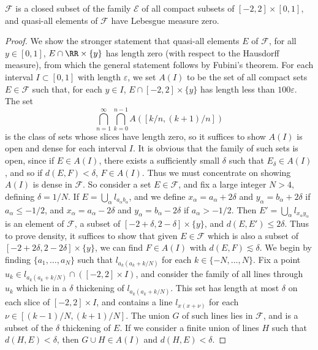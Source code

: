 \begin{theorem}
	$\mathcal{F}$ is a closed subset of the family $\mathcal{E}$ of all compact subsets of $[-2,2] \times [0,1]$, and quasi-all elements of $\mathcal{F}$ have Lebesgue measure zero.
\end{theorem}
\begin{proof}
	We show the stronger statement that quasi-all elements $E$ of $\mathcal{F}$, for all $y \in [0,1]$, $E \cap \RR \times \{ y \}$ has length zero (with respect to the Hausdorff measure), from which the general statement follows by Fubini's theorem. For each interval $I \subset [0,1]$ with length $\varepsilon$, we set $A(I)$ to be the set of all compact sets $E \in \mathcal{F}$ such that, for each $y \in I$, $E \cap [-2,2] \times \{ y \}$ has length less than $100 \varepsilon$. The set
	\[ \bigcap_{n = 1}^\infty \bigcap_{k = 0}^{n-1} A([k/n,(k+1)/n]) \]
	is the class of sets whose slices have length zero, so it suffices to show $A(I)$ is open and dense for each interval $I$. It is obvious that the family of such sets is open, since if $E \in A(I)$, there exists a sufficiently small $\delta$ such that $E_\delta \in A(I)$, and so if $d(E,F) < \delta$, $F \in A(I)$. Thus we must concentrate on showing $A(I)$ is dense in $\mathcal{F}$. So consider a set $E \in \mathcal{F}$, and fix a large integer $N > 4$, defining $\delta = 1/N$. If $E = \bigcup_\alpha l_{a_\alpha b_\alpha}$, and we define $x_\alpha = a_\alpha + 2\delta$ and $y_\alpha = b_\alpha + 2\delta$ if $a_\alpha \leq -1/2$, and $x_\alpha = a_\alpha - 2\delta$ and $y_\alpha = b_\alpha - 2\delta$ if $a_\alpha > -1/2$. Then $E' = \bigcup_\alpha l_{x_\alpha y_\alpha}$ is an element of $\mathcal{F}$, a subset of $[-2+\delta,2-\delta] \times \{ y \}$, and $d(E,E') \leq 2\delta$. Thus to prove density, it suffices to show that given $E \in \mathcal{F}$ which is also a subset of $[-2+2\delta,2-2\delta] \times \{ y \}$, we can find $F \in A(I)$ with $d(E,F) \lesssim \delta$. We begin by finding $\{ a_1, \dots, a_N \}$ such that $l_{a_k(a_k + k/N)}$ for each $k \in \{ -N, \dots, N \}$. Fix a point $u_k \in l_{a_k(a_k + k/N)} \cap ([-2,2] \times I)$, and consider the family of all lines through $u_k$ which lie in a $\delta$ thickening of $l_{a_k(a_k + k/N)}$. This set has length at most $\delta$ on each slice of $[-2,2] \times I$, and contains a line $l_{x(x + \nu)}$ for each $\nu \in [(k-1)/N,(k+1)/N]$. The union $G$ of such lines lies in $\mathcal{F}$, and is a subset of the $\delta$ thickening of $E$. If we consider a finite union of lines $H$ such that $d(H,E) < \delta$, then $G \cup H \in A(I)$ and $d(H,E) < \delta$.
\end{proof}




